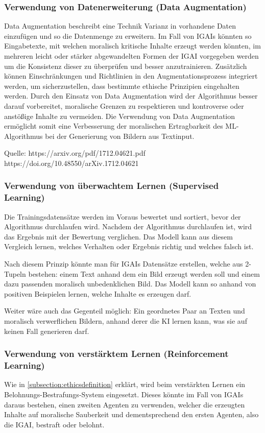 \documentclass[12pt]{article}
\begin{document}
\subsubsection{Verwendung von Datenerweiterung (Data Augmentation)}
Data Augmentation beschreibt eine Technik Varianz in vorhandene Daten einzufügen und so die Datenmenge zu erweitern.
Im Fall von IGAIs könnten so Eingabetexte, mit welchen moralisch kritische Inhalte erzeugt werden könnten, im mehreren leicht oder stärker abgewandelten Formen der IGAI vorgegeben werden um die Konsistenz dieser zu überprüfen und besser anzutrainieren.  
Zusätzlich können Einschränkungen und Richtlinien in den Augmentationsprozess integriert werden, um sicherzustellen, dass bestimmte ethische Prinzipien eingehalten werden. 
Durch den Einsatz von Data Augmentation wird der Algorithmus besser darauf vorbereitet, moralische Grenzen zu respektieren und kontroverse oder anstößige Inhalte zu vermeiden. 
Die Verwendung von Data Augmentation ermöglicht somit eine Verbesserung der moralischen Ertragbarkeit des ML-Algorithmus bei der Generierung von Bildern aus Textinput.

Quelle: 
https://arxiv.org/pdf/1712.04621.pdf 
https://doi.org/10.48550/arXiv.1712.04621

\subsubsection{Verwendung von überwachtem Lernen (Supervised Learning)}
Die Trainingsdatensätze werden im Voraus bewertet und sortiert, bevor der Algorithmus durchlaufen wird. Nachdem der Algorithmus durchlaufen ist, wird das Ergebnis mit der Bewertung verglichen. 
Das Modell kann aus diesem Vergleich lernen, welches Verhalten oder Ergebnis richtig und welches falsch ist.

Nach diesem Prinzip könnte man für IGAIs Datensätze erstellen, welche aus 2-Tupeln bestehen: einem Text anhand dem ein Bild erzeugt werden soll und einem dazu passenden moralisch unbedenklichen Bild. 
Das Modell kann so anhand von positiven Beispielen lernen, welche Inhalte es erzeugen darf.

Weiter wäre auch das Gegenteil möglich: Ein geordnetes Paar an Texten und moralisch verwerflichen Bildern, anhand derer die KI lernen kann, was sie auf keinen Fall generieren darf.

\subsubsection{Verwendung von verstärktem Lernen (Reinforcement Learning)}
Wie in \ref{subsection:ethicsdefinition} erklärt, wird beim verstärkten Lernen ein Belohnungs-Bestrafungs-System eingesetzt. Dieses könnte im Fall von IGAIs daraus bestehen, einen zweiten Agenten zu verwenden, welcher die erzeugten Inhalte auf moralische Sauberkeit und dementsprechend den ersten Agenten, also die IGAI, bestraft oder belohnt.
\end{document}
